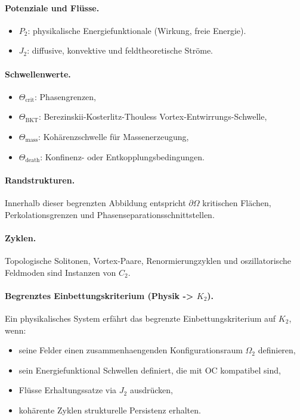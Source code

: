 \paragraph{Potenziale und Flüsse.}
\begin{itemize}
  \item \(P_2\): physikalische Energiefunktionale (Wirkung, freie Energie).
  \item \(J_2\): diffusive, konvektive und feldtheoretische Ströme.
\end{itemize}

\paragraph{Schwellenwerte.}
\begin{itemize}
  \item \(\Theta_{\mathrm{crit}}\): Phasengrenzen,
  \item \(\Theta_{\mathrm{BKT}}\): Berezinskii-Kosterlitz-Thouless
        Vortex-Entwirrungs-Schwelle,
  \item \(\Theta_{\mathrm{mass}}\): Kohärenzschwelle für Massenerzeugung,
  \item \(\Theta_{\mathrm{death}}\): Konfinenz- oder Entkopplungsbedingungen.
\end{itemize}

\paragraph{Randstrukturen.}
Innerhalb dieser begrenzten Abbildung entspricht \(\partial\Omega\) kritischen
Flächen, Perkolationsgrenzen und Phasenseparationsschnittstellen.

\paragraph{Zyklen.}
Topologische Solitonen, Vortex-Paare, Renormierungzyklen und oszillatorische
Feldmoden sind Instanzen von \(C_2\).

\paragraph{Begrenztes Einbettungskriterium (Physik -> \texorpdfstring{\(K_2\)}{K2}).}
Ein physikalisches System erfährt das begrenzte Einbettungskriterium auf
\(K_2\), wenn:
\begin{itemize}
  \item seine Felder einen zusammenhaengenden Konfigurationsraum \(\Omega_2\)
        definieren,
  \item sein Energiefunktional Schwellen definiert, die mit OC kompatibel sind,
  \item Flüsse Erhaltungssatze via \(J_2\) ausdrücken,
  \item kohärente Zyklen strukturelle Persistenz erhalten.
\end{itemize}

